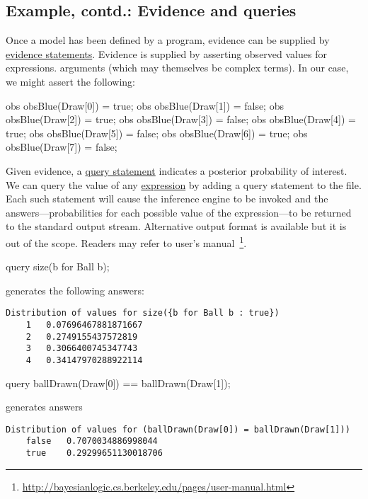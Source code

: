 \documentclass[12pt]{article}
\begin{document}
\subsection{Example, contd.: Evidence and queries}

Once a model has been defined by a \bl program, evidence can be
supplied by \hyperref[evidence-section]{evidence statements}.  
Evidence is supplied by asserting observed values for expressions.
arguments (which may themselves be complex terms). In our case, we might 
assert the following:
\begin{blogcode}
obs obsBlue(Draw[0]) = true;
obs obsBlue(Draw[1]) = false;
obs obsBlue(Draw[2]) = true;
obs obsBlue(Draw[3]) = false;
obs obsBlue(Draw[4]) = true;
obs obsBlue(Draw[5]) = false;
obs obsBlue(Draw[6]) = true;
obs obsBlue(Draw[7]) = false;
\end{blogcode}
Given
evidence, a \hyperref[query-section]{query statement} indicates a
posterior probability of interest. We can query the value of any \hyperref[expression-section]{expression}
by adding a query statement to the file. Each such statement will cause the inference engine to be invoked 
and the answers---probabilities for each possible value of the
expression---to be returned to the standard output stream. Alternative output format is available but it is out of the scope. Readers may refer to \bl user's manual~\footnote{\url{http://bayesianlogic.cs.berkeley.edu/pages/user-manual.html}}. 
\begin{blogcode}
query size({b for Ball b});
\end{blogcode}
generates the following answers:
\begin{verbatim}
Distribution of values for size({b for Ball b : true})
	1	0.07696467881871667
	2	0.2749155437572819
	3	0.3066400745347743
	4	0.34147970288922114
\end{verbatim}
\begin{blogcode}
query ballDrawn(Draw[0]) == ballDrawn(Draw[1]);
\end{blogcode}
generates answers
\begin{verbatim}
Distribution of values for (ballDrawn(Draw[0]) = ballDrawn(Draw[1]))
	false	0.7070034886998044
	true	0.29299651130018706
\end{verbatim}
\end{document}
